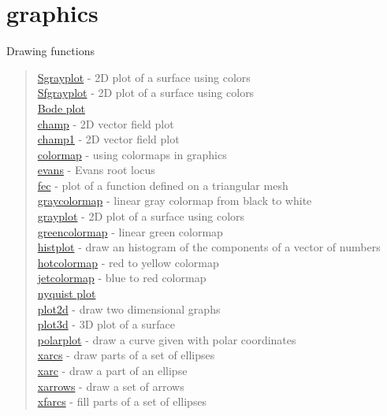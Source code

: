 \chapter*{graphics}

Drawing functions
\begin{quote}
\noindent
\hyperlink{Sgrayplot}{Sgrayplot} - 2D plot of a surface using colors \\
\hyperlink{Sfgrayplot}{Sfgrayplot} - 2D plot of a surface using colors \\
\hyperlink{bode}{Bode plot}\\
\hyperlink{champ}{champ} - 2D vector field plot \\
\hyperlink{champ1}{champ1} - 2D vector field plot \\
\hyperlink{colormap}{colormap} - using colormaps in graphics\\
\hyperlink{evans}{evans} - Evans root locus\\
\hyperlink{fec}{fec} -  plot of a function defined on a triangular mesh\\
\hyperlink{graycolormap}{graycolormap} - linear gray colormap from black to white\\
\hyperlink{grayplot}{grayplot} - 2D plot of a surface using colors \\
\hyperlink{greencolormap}{greencolormap} - linear green colormap\\
\hyperlink{histplot}{histplot} - draw an histogram of the components of a vector of numbers\\
\hyperlink{hotcolormap}{hotcolormap} - red to yellow colormap\\
\hyperlink{jetcolormap}{jetcolormap} - blue to red colormap \\
\hyperlink{nyquist}{nyquist plot}\\
\hyperlink{plot2d}{plot2d} - draw two dimensional graphs\\
\hyperlink{plot3d}{plot3d} - 3D plot of a surface \\
\hyperlink{polarplot}{polarplot} - draw a curve given with polar coordinates \\
\hyperlink{xarcs}{xarcs} - draw parts of a set of ellipses \\
\hyperlink{xarc}{xarc} - draw a part of an ellipse\\
\hyperlink{xarrows}{xarrows} - draw a set of arrows \\
\hyperlink{xfarcs}{xfarcs} - fill parts of a set of ellipses \\

\end{quote}
